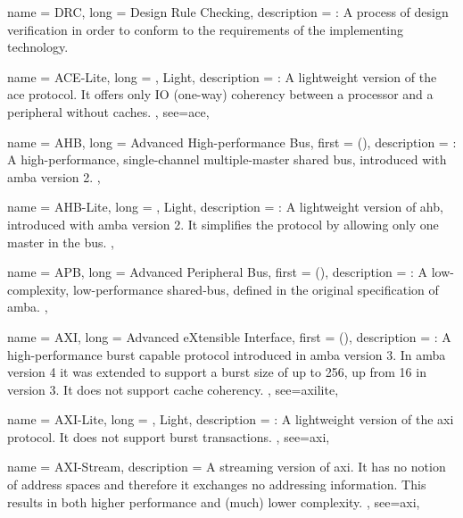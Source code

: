 {
	name = {DRC},
	long = {Design Rule Checking},
	description = {\emph{}:
		A process of design verification in order to conform to the requirements
		of the implementing technology.
	}
}

{
	name = {ACE-Lite},
	long = {, Light},
	description = {\emph{}:
		A lightweight version of the \gls{ace} protocol. It offers only IO (one-way) coherency
		between a processor and a peripheral without caches.
	},
	see={ace},
}


{
	name = {AHB},
	long = {Advanced High-performance Bus},
	first = { ()},
	description = {\emph{}:
		A high-performance, single-channel multiple-master shared bus, 
		introduced with \gls{amba} version 2.
	},
}


{
	name = {AHB-Lite},
	long = {, Light},
	description = {\emph{}:
		A lightweight version of \gls{ahb}, introduced with \gls{amba} version 2.
		It simplifies the protocol by allowing only one master in the bus.
	},
}


{
	name = {APB},
	long = {Advanced Peripheral Bus},
	first = { ()},
	description = {\emph{}:
		A low-complexity, low-performance shared-bus, defined in the original
		specification of \gls{amba}.
	},
}


{
	name = {AXI},
	long = {Advanced eXtensible Interface},
	first = { ()},
	description = {\emph{}:
		A high-performance \gls{burst} capable protocol introduced in \gls{amba} version 3.
		In \gls{amba} version 4 it was extended to support a \gls{burst} size of up to 256,
		up from 16 in version 3. It does not support cache coherency.
	},
	see={axilite},
}


{
	name = {AXI-Lite},
	long = {, Light},
	description = {\emph{}:
		A lightweight version of the \gls{axi} protocol. 
		It does not support \gls{burst} transactions.
	},
	see={axi},
}

{
	name = {AXI-Stream},
	description = {
		A streaming version of \gls{axi}. It has no notion of address spaces
		and therefore it exchanges no addressing information. 
		This results in both higher performance and (much) lower complexity.
	},
	see={axi},
}




